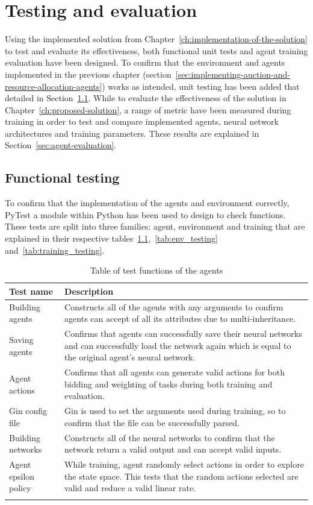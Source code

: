
\chapter{Testing and evaluation}\label{ch:testing-and-evaluation}
Using the implemented solution from Chapter~\ref{ch:implementation-of-the-solution} to test and evaluate its
effectiveness, both functional unit tests and agent training evaluation have been designed. To confirm that the
environment and agents implemented in the previous chapter
(section~\ref{sec:implementing-auction-and-resource-allocation-agents}) works as intended, unit testing has been added
that detailed in Section~\ref{sec:functional-testing}. While to evaluate the effectiveness of the solution
in Chapter~\ref{ch:proposed-solution}, a range of metric have been measured during training in order to
test and compare implemented agents, neural network architectures and training parameters. These results are explained
in Section~\ref{sec:agent-evaluation}.

\section{Functional testing}\label{sec:functional-testing}
To confirm that the implementation of the agents and environment correctly, PyTest a module within Python has been used
to design to check functions. These tests are split into three families: agent, environment and training that are
explained in their respective tables~\ref{tab:agent_testing},~\ref{tab:env_testing} and~\ref{tab:training_testing}.

\begin{longtable}{|p{3cm}|p{11cm}|} \hline
    \textbf{Test name} & \textbf{Description} \\ \hline
    Building agents & Constructs all of the agents with any arguments to confirm agents can accept of all its
        attributes due to multi-inheritance. \\ \hline
    Saving agents & Confirms that agents can successfully save their neural networks and can successfully load
        the network again which is equal to the original agent's neural network. \\ \hline
    Agent actions & Confirms that all agents can generate valid actions for both bidding and weighting of tasks during
        both training and evaluation. \\ \hline
    Gin config file & Gin is used to set the arguments used during training, so to confirm that the file can be
        successfully parsed. \\ \hline
    Building networks & Constructs all of the neural networks to confirm that the network return a valid output
        and can accept valid inputs. \\ \hline
    Agent epsilon policy & While training, agent randomly select actions in order to explore the state space.
        This tests that the random actions selected are valid and reduce a valid linear rate. \\ \hline
    \caption{Table of test functions of the agents}
    \label{tab:agent_testing}
\end{longtable}

